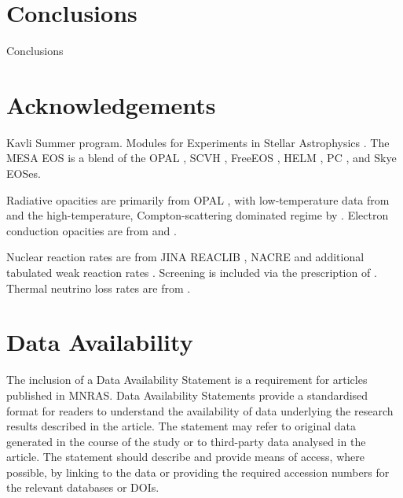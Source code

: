 \documentclass[fleqn,usenatbib]{mnras}
\begin{document}
\section{Conclusions}

Conclusions

\section*{Acknowledgements}

Kavli Summer program. Modules for Experiments in Stellar Astrophysics
\citep[MESA][]{Paxton2011, Paxton2013, Paxton2015, Paxton2018, Paxton2019, Jermyn2023}. The MESA EOS is a blend of the OPAL \citep{Rogers2002}, SCVH
\citep{Saumon1995}, FreeEOS \citep{Irwin2004}, HELM \citep{Timmes2000},
PC \citep{Potekhin2010}, and Skye \citep{Jermyn2021} EOSes.

Radiative opacities are primarily from OPAL \citep{Iglesias1993,
Iglesias1996}, with low-temperature data from \citet{Ferguson2005}
and the high-temperature, Compton-scattering dominated regime by
\citet{Poutanen2017}.  Electron conduction opacities are from
\citet{Cassisi2007} and \citet{Blouin2020}.

Nuclear reaction rates are from JINA REACLIB \citep{Cyburt2010}, NACRE \citep{Angulo1999} and
additional tabulated weak reaction rates \citet{Fuller1985, Oda1994,
Langanke2000}.  Screening is included via the prescription of \citet{Chugunov2007}.
Thermal neutrino loss rates are from \citet{Itoh1996}.

\section*{Data Availability}

 
The inclusion of a Data Availability Statement is a requirement for articles published in MNRAS. Data Availability Statements provide a standardised format for readers to understand the availability of data underlying the research results described in the article. The statement may refer to original data generated in the course of the study or to third-party data analysed in the article. The statement should describe and provide means of access, where possible, by linking to the data or providing the required accession numbers for the relevant databases or DOIs.




\end{document}
